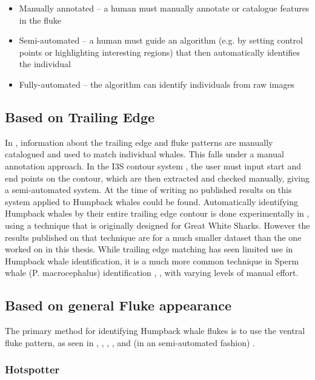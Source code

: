 \begin{itemize}
	\item Manually annotated -- a human must manually annotate or catalogue features in the fluke
	\item Semi-automated -- a human must guide an algorithm (e.g. by setting control points or highlighting interesting regions) that then automatically identifies the individual
	\item Fully-automated -- the algorithm can identify individuals from raw images
\end{itemize}

\subsection{Based on Trailing Edge}

In \cite{mizroch1990computer}, information about the trailing edge and fluke patterns are manually catalogued and used to match individual whales. This falls under a manual annotation approach.
In the I3S contour system \cite{i3scontour}, the user must input start and end points on the contour, which are then extracted and checked manually, giving a semi-automated system. 
At the time of writing no published results on this system applied to Humpback whales could be found.
Automatically identifying Humpback whales by their entire trailing edge contour is done experimentally in \cite{hughes2015automated}, using a technique that is originally designed for Great White Sharks. 
However the results published on that technique are for a much smaller dataset than the one worked on in this thesis.
While trailing edge matching has seen limited use in Humpback whale identification, it is a much more common technique in Sperm whale (P. macrocephalus) identification \cite{huele2000finding}, \cite{beekmans2005comparison} \cite{whitehead1990computer}, with varying levels of manual effort.

\subsection{Based on general Fluke appearance}

The primary method for identifying Humpback whale flukes is to use the ventral fluke pattern, as seen in \cite{mizroch1990computer}, \cite{carlson1990changes}, \cite{blackmer2000temporal}, \cite{friday2000measurement}, and (in an semi-automated fashion) \cite{kniest2010fluke}. 

\subsubsection{Hotspotter}


